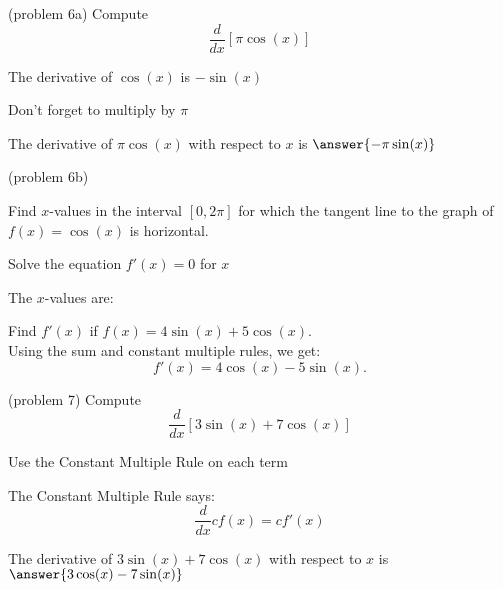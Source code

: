 \documentclass[handout]{ximera}
\begin{document}
\begin{problem}(problem 6a)
  Compute 
  \[
  \frac{d}{dx} \left[\pi\cos(x)\right]
  \]
  
    \begin{hint}
      The derivative of $\cos(x)$ is $-\sin(x)$
    \end{hint}
		\begin{hint}
		  Don't forget to multiply by $\pi$
		\end{hint}
		
		The derivative of $\pi\cos(x)$ with respect to $x$ is
		 $\answer{-\pi\sin(x)}$
	
\end{problem}



\begin{problem}(problem 6b)

Find $x$-values in the interval $[0, 2\pi]$ for which the tangent line to the graph of $f(x) = \cos(x)$ is horizontal.


\begin{hint}
Solve the equation $f'(x) = 0$ for $x$
\end{hint}

The $x$-values are:
\begin{multipleChoice}
  \choice{$-\pi,0 \pi$}
\end{multipleChoice}

\end{problem}



\begin{foldable}
\end{foldable}


\begin{example}[example 7]
 Find $f'(x)$ if $f(x) = 4\sin(x) + 5\cos(x).$ \\
 Using the sum and constant multiple rules, we get: 
\[
f'(x) = 4\cos(x) - 5\sin(x).
\]
\end{example}


\begin{problem}(problem 7)
  Compute 
  \[
  \frac{d}{dx} \left[3\sin(x) + 7\cos(x)\right]
  \]
  
		\begin{hint}
      Use the Constant Multiple Rule on each term
    \end{hint}
    \begin{hint}
      The Constant Multiple Rule says:
      \[
      \frac{d}{dx} cf(x) = cf'(x)
      \]
    \end{hint}    
		The derivative of $3\sin(x) + 7\cos(x)$ with respect to $x$ is
		 $\answer{3\cos(x) - 7\sin(x)}$
	
\end{problem}
\end{document}
